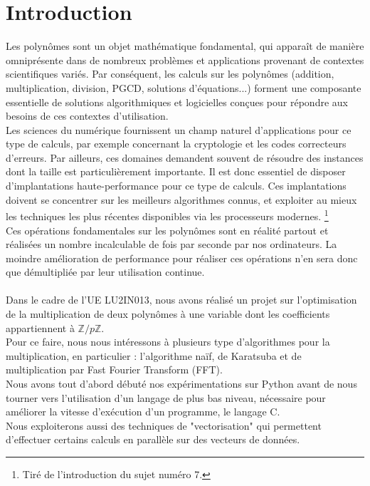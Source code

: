 \documentclass[12pt, a4paper]{article}
\begin{document}
\tableofcontents
\newpage

\section*{Introduction}

Les polynômes sont un objet mathématique fondamental, qui apparaît de manière omniprésente dans de nombreux problèmes et applications provenant de contextes scientifiques variés. Par conséquent, les calculs sur les polynômes (addition, multiplication, division, PGCD, solutions d’équations...) forment une composante essentielle de solutions algorithmiques et logicielles conçues pour répondre aux besoins de ces contextes d’utilisation. \\
\indent Les sciences du numérique fournissent un champ naturel d’applications pour ce type de calculs, par exemple concernant la cryptologie et les codes correcteurs d’erreurs. Par ailleurs, ces domaines demandent souvent de résoudre des instances dont la taille est particulièrement importante. Il est donc essentiel de disposer d’implantations haute-performance pour ce type de calculs. Ces implantations doivent se concentrer sur les meilleurs algorithmes connus, et exploiter au mieux les techniques les plus récentes disponibles via les processeurs modernes. \footnote{Tiré de l'introduction du sujet numéro 7.} \\
\indent Ces opérations fondamentales sur les polynômes sont en réalité partout et réalisées un nombre incalculable de fois par seconde par nos ordinateurs. La moindre amélioration de performance pour réaliser ces opérations n'en sera donc que démultipliée par leur utilisation continue. \\
\ \\
\indent Dans le cadre de l'UE LU2IN013, nous avons réalisé un projet sur l'optimisation de la multiplication de deux polynômes à une variable dont les coefficients appartiennent à $\mathbb{Z}/p\mathbb{Z}$. \\
\indent Pour ce faire, nous nous intéressons à plusieurs type d'algorithmes pour la multiplication, en particulier : l'algorithme naïf, de Karatsuba et de multiplication par Fast Fourier Transform (FFT).\\
\indent Nous avons tout d'abord débuté nos expérimentations sur Python avant de nous tourner vers l'utilisation d'un langage de plus bas niveau, nécessaire pour améliorer la vitesse d'exécution d'un programme, le langage C.\\
\indent Nous exploiterons aussi des techniques de "vectorisation" qui permettent d’effectuer certains calculs en parallèle sur des vecteurs de données.
\end{document}
